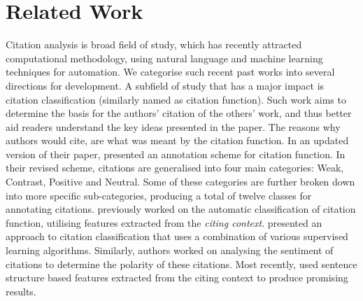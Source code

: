 \chapter{Related Work}
\label{Related Works}

Citation analysis is broad field of study, which has recently attracted computational methodology, using natural language and machine learning techniques for automation.  We categorise such recent past works into several directions for development.  A subfield of study that has a major impact is citation classification (similarly named as citation function). Such work aims to determine the basis for the authors' citation of the others' work, and thus better aid readers understand the key ideas presented in the paper. The reasons why authors would cite, are what was meant by the citation function. In an updated version of their paper,  presented an annotation scheme for citation function. In their revised scheme, citations are generalised into four main categories: 
Weak, Contrast, Positive and Neutral. Some of these categories are further broken down into more specific sub-categories, producing a total of twelve classes for annotating citations.  previously worked on the automatic classification of citation function, utilising features extracted from the
\textit{citing context}. 
 presented an approach to citation classification that uses a combination of various supervised learning algorithms. Similarly, authors worked on analysing the 
sentiment of citations to determine the polarity of these citations. Most recently,  used sentence structure based features extracted from the citing context to produce 
promising results.

